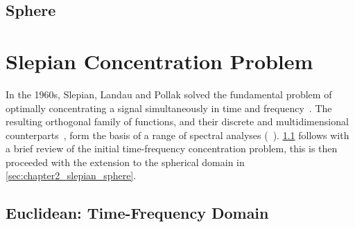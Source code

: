 \subsection{Sphere}\label{sec:chapter2_wavelets_sphere}





\section{Slepian Concentration Problem}\label{sec:chapter2_slepian_concentration_problem}

In the 1960s, Slepian, Landau and Pollak solved the fundamental problem of optimally concentrating a signal simultaneously in time and frequency~\cite{Landau1961,Landau1962,Slepian1983,Slepian1961}.
The resulting orthogonal family of functions, and their discrete and multidimensional counterparts~\cite{Bronez1988,Hanssen1997,Liu1992,Slepian1964,Slepian1978}, form the basis of a range of spectral analyses (\eg{}~\cite{Thomson1982,Thomson1990}).
\cref{sec:chapter2_slepian_euclidean} follows with a brief review of the initial time-frequency concentration problem, this is then proceeded with the extension to the spherical domain in \cref{sec:chapter2_slepian_sphere}.

\subsection{Euclidean: Time-Frequency Domain}\label{sec:chapter2_slepian_euclidean}

